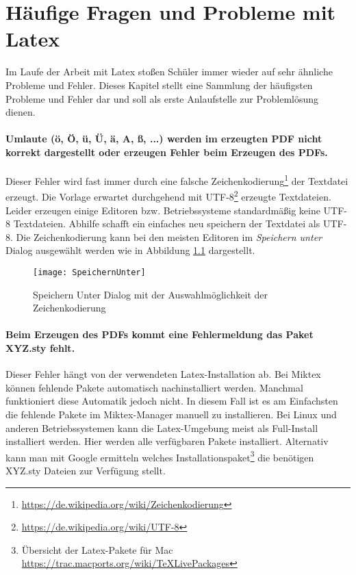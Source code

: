 \chapter{Häufige Fragen und Probleme mit Latex}

Im Laufe der Arbeit mit Latex stoßen Schüler immer wieder auf sehr ähnliche Probleme und Fehler. 
Dieses Kapitel stellt eine Sammlung der häufigsten Probleme und Fehler dar und soll als erste Anlaufstelle zur Problemlösung dienen.

\subsubsection*{Umlaute (ö, Ö, ü, Ü, ä, A, ß, ...) werden im erzeugten PDF nicht korrekt dargestellt oder erzeugen Fehler beim Erzeugen des PDFs.}
Dieser Fehler wird fast immer durch eine falsche Zeichenkodierung\footnote{\url{https://de.wikipedia.org/wiki/Zeichenkodierung}} der Textdatei erzeugt. 
Die Vorlage erwartet durchgehend mit UTF-8\footnote{\url{https://de.wikipedia.org/wiki/UTF-8}} erzeugte Textdateien. 
Leider erzeugen einige Editoren bzw. Betriebssysteme standardmäßig keine UTF-8 Textdateien. Abhilfe schafft ein einfaches neu speichern der Textdatei als UTF-8. 
Die Zeichenkodierung kann bei den meisten Editoren im \textit{Speichern unter} Dialog ausgewählt werden wie in Abbildung \ref{fig:speichernunter} dargestellt.

\begin{figure}
\centering
\texttt{[image: SpeichernUnter]}
\caption{Speichern Unter Dialog mit der Auswahlmöglichkeit der Zeichenkodierung}
\label{fig:speichernunter}
\end{figure}

\subsubsection*{Beim Erzeugen des PDFs kommt eine Fehlermeldung das Paket XYZ.sty fehlt.}
Dieser Fehler hängt von der verwendeten Latex-Installation ab. Bei Miktex können fehlende Pakete automatisch nachinstalliert werden. 
Manchmal funktioniert diese Automatik jedoch nicht. In diesem Fall ist es am Einfachsten die fehlende Pakete im Miktex-Manager manuell zu installieren. 
Bei Linux und anderen Betriebssystemen kann die Latex-Umgebung meist als Full-Install installiert werden. Hier werden alle verfügbaren Pakete installiert. 
Alternativ kann man mit Google ermitteln welches Installationspaket\footnote{Übersicht der Latex-Pakete für Mac \url{https://trac.macports.org/wiki/TeXLivePackages}} die benötigen XYZ.sty Dateien zur Verfügung stellt.

